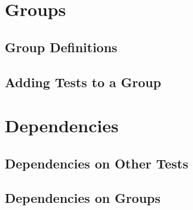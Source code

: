 \documentclass[a4paper, 10pt]{book}
\begin{document}


\tableofcontents











\chapter{Groups}
\section{Group Definitions}
\section{Adding Tests to a Group}

\chapter{Dependencies}
\section{Dependencies on Other Tests}
\section{Dependencies on Groups}


\end{document}
